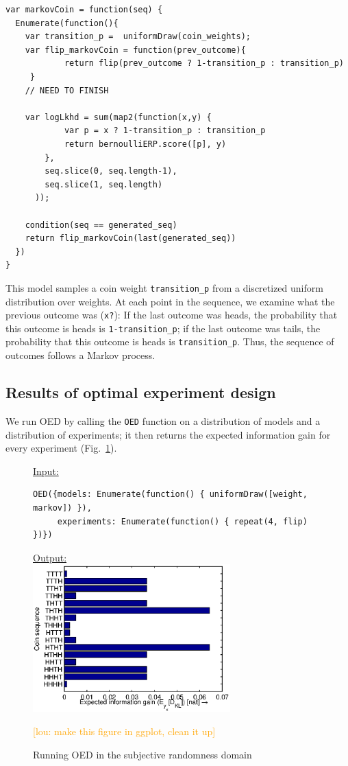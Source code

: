 \documentclass{article}
\newcommand{\lou}[1]{\textcolor{orange}{[lou: #1]}}
\begin{document}
\begin{lstlisting}[caption=Markov coin model]
var markovCoin = function(seq) {
  Enumerate(function(){
    var transition_p =  uniformDraw(coin_weights);
    var flip_markovCoin = function(prev_outcome){
    		return flip(prev_outcome ? 1-transition_p : transition_p)
	 }
	// NEED TO FINISH

    var logLkhd = sum(map2(function(x,y) {
    		var p = x ? 1-transition_p : transition_p
     	 	return bernoulliERP.score([p], y)
    	},
    	seq.slice(0, seq.length-1),
    	seq.slice(1, seq.length)
	  ));

    condition(seq == generated_seq)
    return flip_markovCoin(last(generated_seq))
  })
}
\end{lstlisting}
%
This model samples a coin weight \lstinline{transition_p} from a discretized uniform distribution over weights.
At each point in the sequence, we examine what the previous outcome was (\lstinline{x?}): If the last outcome was heads, the probability that this outcome is heads is \lstinline{1-transition_p}; if the last outcome was tails, the probability that this outcome is heads is \lstinline{transition_p}. Thus, the sequence of outcomes follows a Markov process.

\subsection{Results of optimal experiment design}

We run OED by calling the \lstinline{OED} function on a distribution of models and a distribution of experiments; it then returns the expected information gain for every experiment (Fig.~\ref{fig:run-coin}).

\begin{figure}[h!]
\underline{\textsf{Input:}}
\begin{lstlisting}
OED({models: Enumerate(function() { uniformDraw([weight, markov]) }),
     experiments: Enumerate(function() { repeat(4, flip) })})
\end{lstlisting}

\underline{\textsf{Output:}}\\
\includegraphics[width=3in]{img/coin.eps}
\caption{Running OED in the subjective randomness domain}
\lou{make this figure in ggplot, clean it up}
\label{fig:run-coin}
\end{figure}
\end{document}
